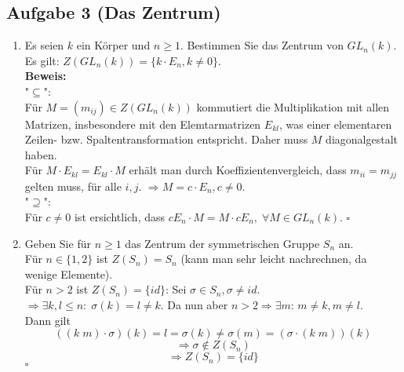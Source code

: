 \documentclass[11pt,a4paper,ngerman]{article}
\begin{document}
\subsection*{Aufgabe 3 \mdseries (Das Zentrum)}

\begin{enumerate}[\bfseries a)]
\item Es seien $k$ ein Körper und $n \geq 1$. Bestimmen Sie das Zentrum von $GL_n(k)$. \\

Es gilt: $Z(GL_n(k)) = \{ k \cdot E_n, k \neq 0 \}$. \\
\textbf{Beweis:}\\
"$\subseteq$": \\
Für $M = (m_{ij}) \in Z(GL_n(k))$ kommutiert die Multiplikation mit allen Matrizen, insbesondere mit den Elemtarmatrizen $E_{kl}$, was einer elementaren Zeilen- bzw. Spaltentransformation entspricht. Daher muss $M$ diagonalgestalt haben.\\
Für $M \cdot E_{kl} = E_{kl} \cdot M$ erhält man durch Koeffizientenvergleich, dass $m_{ii} = m_{jj}$ gelten muss, für alle $i,j$. $\Rightarrow M = c \cdot E_n, c \neq 0$. \\
"$\supseteq$":\\
Für $c \neq 0$ ist ersichtlich, dass $c E_n \cdot M = M \cdot c E_n,\; \forall M \in GL_n(k)$. 
\mbox{} \hfill $\square$

\item Geben Sie für $n \geq 1$ das Zentrum der symmetrischen Gruppe $S_n$ an. \\
Für $n \in \{1,2 \}$ ist $Z(S_n) = S_n$ (kann man sehr leicht nachrechnen, da wenige Elemente). \\
Für $n > 2$ ist $Z(S_n) = \{ id \}$: Sei $\sigma \in S_n, \sigma \neq id$.\\
$ \Rightarrow \exists k,l \leq n: \; \sigma(k) = l \neq k$. Da nun aber $n > 2 \Rightarrow \exists m:\, m\neq k, m\neq l$. \\
Dann gilt 
$$ ((k \; m) \cdot \sigma)(k) = l = \sigma(k) \neq \sigma(m) = (\sigma \cdot (k \; m))(k) $$
$$ \Rightarrow \sigma \notin Z(S_n) $$
$$ \Rightarrow Z(S_n) = \{ id \} $$
\mbox{} \hfill $\square$
\end{enumerate}
\end{document}
